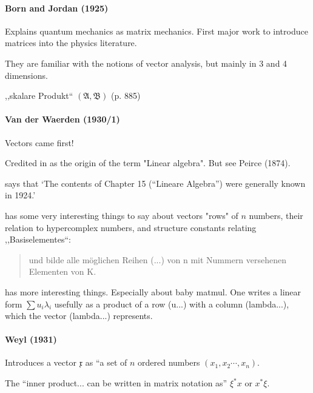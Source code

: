 \paragraph{Born and Jordan (1925)~\cite{Born1925}}

Explains quantum mechanics as matrix mechanics. First major work to introduce matrices into the physics literature.

They are familiar with the notions of vector analysis, but mainly in 3 and 4 dimensions.

,,skalare Produkt`` $(\mathfrak A, \mathfrak B)$ (p. 885)



\paragraph{Van der Waerden (1930/1)~\cite{vdWaerden1930,vdWaerden1931}}

Vectors came first!


Credited in \cite{Kleiner2007} as the origin of the term "Linear algebra". But see
Peirce (1874).

\cite[p. 36]{vdWaerden1975} says that `The contents of Chapter 15 (``Lineare Algebra'') were generally
known in 1924.'


\cite[\S 10, pp. 43-44]{vdWaerden1930} has some very interesting things to say about vectors "rows" of $n$ numbers,
their relation to hypercomplex numbers, and structure constants relating ,,Basiselementes``:

\begin{quote}
und bilde alle möglichen Reihen (...) von n
mit Nummern versehenen Elementen von K.


\end{quote}

\cite[\S 104, pp. 110. ff.]{vdWaerden1931} has more interesting things.
Especially about baby matmul.
One writes a linear form $\sum u_i \lambda_i$ usefully as a product of a row (u...) with a column (lambda...), which the vector (lambda...) represents.



\paragraph{Weyl (1931)~\cite{Weyl1931}}

Introduces a vector $\mathfrak x$ as ``a set of $n$ ordered numbers $(x_1, x_2 \cdots, x_n)$.

The ``inner product... can be written in matrix notation as''
$\xi^*x$ or $x^*\xi$.

